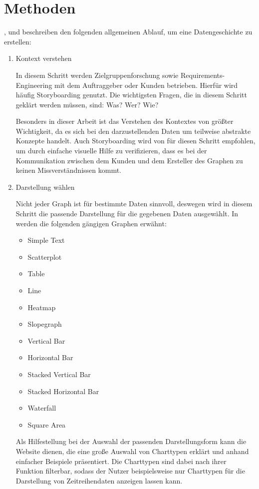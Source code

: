 \section{Methoden}\label{sec:methoden}
\cite{Prof.Dr.ChristianBeecks.}, \cite{TalksatGoogle.2015} und \cite{Knaflic.2016} beschreiben den folgenden allgemeinen Ablauf, um eine Datengeschichte zu erstellen:
\begin{enumerate}
    \item Kontext verstehen\hfill
    
    In diesem Schritt werden Zielgruppenforschung sowie Requirements-Engineering mit dem Auftraggeber oder Kunden betrieben. Hierfür wird häufig Storyboarding genutzt. Die wichtigsten Fragen, die in diesem Schritt geklärt werden müssen, sind: Was? Wer? Wie?
    
    Besonders in dieser Arbeit ist das Verstehen des Kontextes von größter Wichtigkeit, da es sich bei den darzustellenden Daten um teilweise abstrakte Konzepte handelt. Auch Storyboarding wird von \cite{Knaflic.2016} für diesen Schritt empfohlen, um durch einfache visuelle Hilfe zu verifizieren, dass es bei der Kommunikation zwischen dem Kunden und dem Ersteller des Graphen zu keinen Missverständnissen kommt.
    
    \item Darstellung wählen\hfill
    
    Nicht jeder Graph ist für bestimmte Daten sinnvoll, deswegen wird in diesem Schritt die passende Darstellung für die gegebenen Daten ausgewählt. In \cite{Knaflic.2016} werden die folgenden gängigen Graphen erwähnt:
    \begin{multicols}{2}
    \begin{itemize}
        \item Simple Text
        \item Scatterplot
        \item Table
        \item Line
        \item Heatmap
        \item Slopegraph
        \item Vertical Bar
        \item Horizontal Bar
        \item Stacked Vertical Bar
        \item Stacked Horizontal Bar
        \item Waterfall
        \item Square Area
    \end{itemize}
    \end{multicols}
    Als Hilfestellung bei der Auswahl der passenden Darstellungsform kann die Website \cite{SeverinoRibecca.} dienen, die eine große Auswahl von Charttypen erklärt und anhand einfacher Beispiele präsentiert. Die Charttypen sind dabei nach ihrer Funktion filterbar, sodass der Nutzer beispielsweise nur Charttypen für die Darstellung von Zeitreihendaten anzeigen lassen kann.


\end{enumerate}
